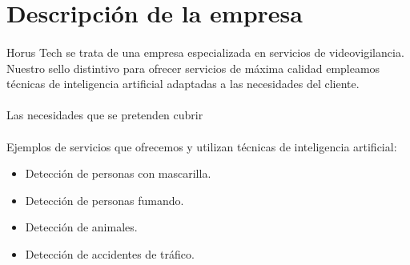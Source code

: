 \section{Descripción de la empresa}

\paragraph{}

Horus Tech se trata de una empresa especializada en servicios de videovigilancia. Nuestro sello distintivo para ofrecer servicios de máxima calidad empleamos técnicas de inteligencia artificial adaptadas a las necesidades del cliente.
\paragraph{}
Las necesidades que se pretenden cubrir 


\paragraph{}
Ejemplos de servicios que ofrecemos y utilizan técnicas de inteligencia artificial:
\begin{itemize}
	\item Detección de personas con mascarilla.
	\item Detección de personas fumando.
	\item Detección de animales.
	\item Detección de accidentes de tráfico.
\end{itemize}
